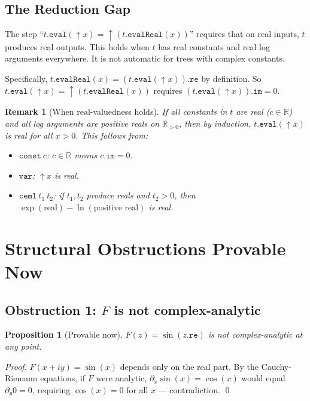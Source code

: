 \documentclass[12pt]{article}
\newtheorem{remark}[theorem]{Remark}
\newtheorem{proposition}[theorem]{Proposition}
\begin{document}
\subsection{The Reduction Gap}

The step ``$t.\mathtt{eval}(\uparrow\!x) = \uparrow(t.\mathtt{evalReal}(x))$'' requires
that on real inputs, $t$ produces real outputs. This holds when $t$ has real constants
and real log arguments everywhere. It is not automatic for trees with complex constants.

Specifically, $t.\mathtt{evalReal}(x) = (t.\mathtt{eval}(\uparrow\!x)).\mathtt{re}$
by definition. So $t.\mathtt{eval}(\uparrow\!x) = \uparrow(t.\mathtt{evalReal}(x))$
requires $(t.\mathtt{eval}(\uparrow\!x)).\mathtt{im} = 0$.

\begin{remark}[When real-valuedness holds]
If all constants in $t$ are real ($c \in \mathbb{R}$) and all log arguments are
positive reals on $\mathbb{R}_{>0}$, then by induction, $t.\mathtt{eval}(\uparrow\!x)$
is real for all $x > 0$. This follows from:
\begin{itemize}[noitemsep]
  \item $\mathtt{const}\ c$: $c \in \mathbb{R}$ means $c.\mathtt{im} = 0$.
  \item $\mathtt{var}$: $\uparrow\!x$ is real.
  \item $\mathtt{ceml}\ t_1\ t_2$: if $t_1, t_2$ produce reals and $t_2 > 0$,
    then $\exp(\text{real}) - \ln(\text{positive real})$ is real.
\end{itemize}
\end{remark}

\section{Structural Obstructions Provable Now}

\subsection{Obstruction 1: $F$ is not complex-analytic}

\begin{proposition}[\textcolor{proved}{Provable now}]\label{prop:not-analytic}
$F(z) = \sin(z.\mathtt{re})$ is \emph{not} complex-analytic at any point.
\end{proposition}

\begin{proof}
$F(x + iy) = \sin(x)$ depends only on the real part. By the Cauchy-Riemann equations,
if $F$ were analytic, $\partial_x \sin(x) = \cos(x)$ would equal $\partial_y 0 = 0$,
requiring $\cos(x) = 0$ for all $x$ — contradiction. \qed
\end{proof}
\end{document}
